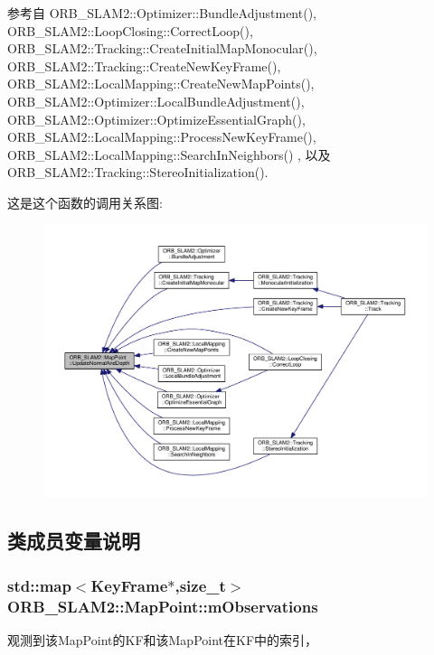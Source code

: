 参考自 O\-R\-B\-\_\-\-S\-L\-A\-M2\-::\-Optimizer\-::\-Bundle\-Adjustment(), O\-R\-B\-\_\-\-S\-L\-A\-M2\-::\-Loop\-Closing\-::\-Correct\-Loop(), O\-R\-B\-\_\-\-S\-L\-A\-M2\-::\-Tracking\-::\-Create\-Initial\-Map\-Monocular(), O\-R\-B\-\_\-\-S\-L\-A\-M2\-::\-Tracking\-::\-Create\-New\-Key\-Frame(), O\-R\-B\-\_\-\-S\-L\-A\-M2\-::\-Local\-Mapping\-::\-Create\-New\-Map\-Points(), O\-R\-B\-\_\-\-S\-L\-A\-M2\-::\-Optimizer\-::\-Local\-Bundle\-Adjustment(), O\-R\-B\-\_\-\-S\-L\-A\-M2\-::\-Optimizer\-::\-Optimize\-Essential\-Graph(), O\-R\-B\-\_\-\-S\-L\-A\-M2\-::\-Local\-Mapping\-::\-Process\-New\-Key\-Frame(), O\-R\-B\-\_\-\-S\-L\-A\-M2\-::\-Local\-Mapping\-::\-Search\-In\-Neighbors() , 以及 O\-R\-B\-\_\-\-S\-L\-A\-M2\-::\-Tracking\-::\-Stereo\-Initialization().



这是这个函数的调用关系图\-:
\nopagebreak
\begin{figure}[H]
\begin{center}
\leavevmode
\includegraphics[width=350pt]{classORB__SLAM2_1_1MapPoint_ac5b8e4ec6a7737860af57058bdd16124_icgraph}
\end{center}
\end{figure}




\subsection{类成员变量说明}
\hypertarget{classORB__SLAM2_1_1MapPoint_a189bea541f860af75ceb60300b59d8e3}{
\subsubsection[{m\-Observations}]{\setlength{\rightskip}{0pt plus 5cm}std\-::map$<${\bf Key\-Frame}$\ast$,size\-\_\-t$>$ O\-R\-B\-\_\-\-S\-L\-A\-M2\-::\-Map\-Point\-::m\-Observations\hspace{0.3cm}{\ttfamily [protected]}}}\label{classORB__SLAM2_1_1MapPoint_a189bea541f860af75ceb60300b59d8e3}
观测到该\-Map\-Point的\-K\-F和该\-Map\-Point在\-K\-F中的索引， 


